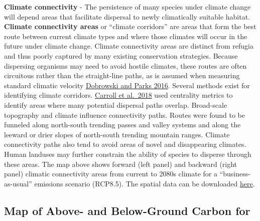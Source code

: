 \documentclass[
]{article}
\begin{document}
\textbf{Climate connectivity} - The persistence of many species under
climate change will depend areas that facilitate dispersal to newly
climatically suitable habitat. \textbf{Climate connectivity areas} or
``climate corridors'' are areas that form the best route between current
climate types and where those climates will occur in the future under
climate change. Climate connectivity areas are distinct from refugia and
thus poorly captured by many existing conservation strategies. Because
dispersing organisms may need to avoid hostile climates, these routes
are often circuitous rather than the straight-line paths, as is assumed
when measuring standard climatic velocity
\href{https://www.nature.com/articles/ncomms12349}{Dobrowski and Parks
2016}. Several methods exist for identifying climate corridors.
\href{https://onlinelibrary.wiley.com/doi/full/10.1111/gcb.14373}{Carroll
et al.~2018} used centrality metrics to identify areas where many
potential dispersal paths overlap. Broad-scale topography and climate
influence connectivity paths. Routes were found to be funneled along
north-south trending passes and valley systems and along the leeward or
drier slopes of north-south trending mountain ranges. Climate
connectivity paths also tend to avoid areas of novel and disappearing
climates. Human landuses may further constrain the ability of species to
disperse through these areas. The map above shows forward (left panel)
and backward (right panel) climatic connectivity areas from current to
2080s climate for a ``business-as-usual'' emissions scenario (RCP8.5).
The spatial data can be downloaded
\href{https://adaptwest.databasin.org/pages/climate-connectivity-north-america}{here}.

\pagebreak

\hypertarget{map-of-above--and-below-ground-carbon-for}{%
\subsection{Map of Above- and Below-Ground Carbon
for}\label{map-of-above--and-below-ground-carbon-for}}
\end{document}
